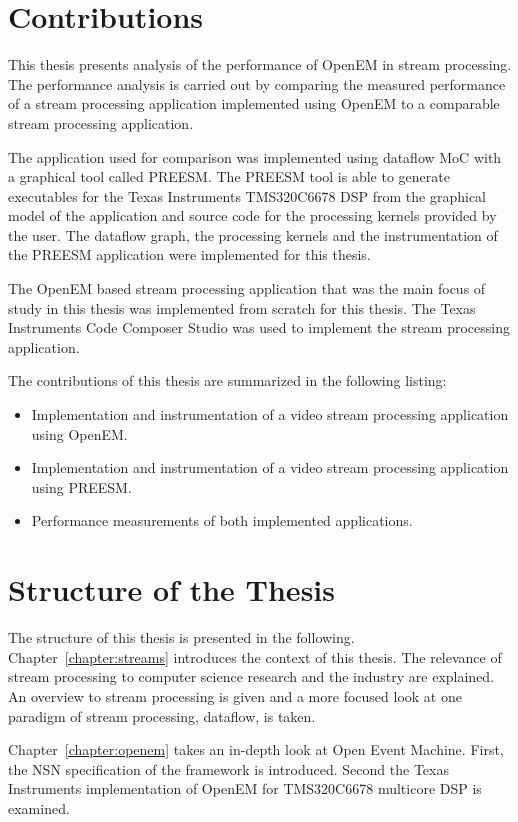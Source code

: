 \section{Contributions}
\label{section:contributions}
This thesis presents analysis of the performance of OpenEM in stream processing. The performance analysis is carried out by comparing the measured performance of a stream processing application implemented using OpenEM to a comparable stream processing application.

The application used for comparison was implemented using dataflow MoC with a graphical tool called PREESM. The PREESM tool is able to generate executables for the Texas Instruments TMS320C6678 DSP from the graphical model of the application and source code for the processing kernels provided by the user. The dataflow graph, the processing kernels and the instrumentation of the PREESM application were implemented for this thesis.

The OpenEM based stream processing application that was the main focus of study in this thesis was implemented from scratch for this thesis. The Texas Instruments Code Composer Studio was used to implement the stream processing application.

The contributions of this thesis are summarized in the following listing:
\begin{itemize}
    \item Implementation and instrumentation of a video stream processing application using OpenEM.
    \item Implementation and instrumentation of a video stream processing application using PREESM.
    \item Performance measurements of both implemented applications.
\end{itemize}

\section{Structure of the Thesis}
\label{section:structure}
The structure of this thesis is presented in the following. Chapter~\ref{chapter:streams} introduces the context of this thesis. The relevance of stream processing to computer science research and the industry are explained. An overview to stream processing is given and a more focused look at one paradigm of stream processing, dataflow, is taken.

Chapter~\ref{chapter:openem} takes an in-depth look at Open Event Machine. First, the NSN specification of the framework is introduced. Second the Texas Instruments implementation of OpenEM for TMS320C6678 multicore DSP is examined.

